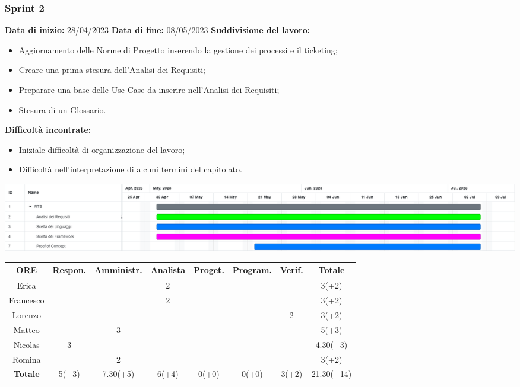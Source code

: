 \documentclass[a4paper, 12pt]{article}
\begin{document}
\subsubsection{Sprint 2}
\textbf{Data di inizio:} 28/04/2023\newline
\textbf{Data di fine:} 08/05/2023\newline
\newline
\textbf{Suddivisione del lavoro:}
\begin{itemize}
    \item Aggiornamento delle Norme di Progetto inserendo la gestione dei processi e il ticketing;
    \item Creare una prima stesura dell'Analisi dei Requisiti;
    \item Preparare una base delle Use Case da inserire nell'Analisi dei Requisiti;
    \item Stesura di un Glossario.
\end{itemize}
\textbf{Difficoltà incontrate:}
\begin{itemize}
    \item Iniziale difficoltà di organizzazione del lavoro;
    \item Difficoltà nell'interpretazione di alcuni termini  del capitolato.
\end{itemize}
\includegraphics[scale=0.24]{RTB_1.png}\newline
\newline
\begin{tabular}{|c|c|c|c|c|c|c|c|}
    \hline
    \textbf{ORE} & \textbf{Respon.} & \textbf{Amministr.} & \textbf{Analista} & \textbf{Proget.} & \textbf{Program.} & \textbf{Verif.} & \textbf{Totale}\\
    \hline
    Erica & & & 2 & & & & 3(+2)\\
    \hline
    Francesco & & & 2 & & & & 3(+2)\\
    \hline
    Lorenzo & & & & & & 2 & 3(+2)\\
    \hline
    Matteo & & 3 & & & & & 5(+3)\\
    \hline
    Nicolas & 3 & & & & & & 4.30(+3)\\
    \hline
    Romina & & 2 & & & & & 3(+2)\\
    \hline
    \textbf{Totale} & 5(+3) & 7.30(+5) & 6(+4) & 0(+0) & 0(+0) & 3(+2) & 21.30(+14)\\
    \hline
\end{tabular}\\[8pt]
\end{document}
